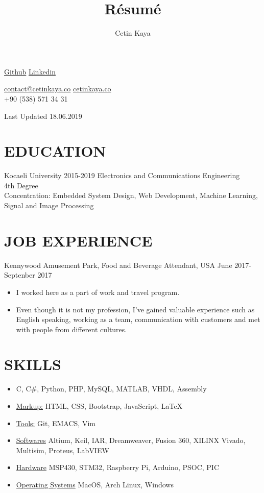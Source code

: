 \documentclass[8pt,twocolumn]{article}
\makeatletter
\renewcommand{\maketitle}{
\begin{center}
{\huge
\thetitle{
}
\vspace{0.5em}

}
{
\huge \bfseries
\theauthor}
\vspace{0.5em}

\faGithub\hspace{0.5em}\textcolor{Mycolor1}{\href{https://github.com/Zrrck?tab=repositories}{Github}}\hspace{0.5em}
\faLinkedin\hspace{0.5em}\textcolor{Mycolor1}{\href{https://www.linkedin.com/in/cetin-kaya/}{Linkedin}}\\\vspace{0.5em}

\faEnvelope \hspace{0.2em}\href{mailto:contact@cetinkaya.co}{contact@cetinkaya.co}\hspace{0.2em}
\faWordpress \hspace{0.2em}\textcolor{Mycolor1}{\href{http://cetinkaya.co}{cetinkaya.co}}\hspace{0.2em}\\
\vspace{0.5em}
\faPhoneSquare+90 (538) 571 34 31\vspace{1.em}



Last Updated 18.06.2019

\end{center}
}
\makeatother
\begin{document}
\title{R\'esum\'e}
\author{Cetin Kaya}
\maketitle




\section{EDUCATION}
Kocaeli University \hspace{10.em} 2015-2019
Electronics and Communications Engineering\\ 4th Degree \\
Concentration: Embedded System Design, Web Development, Machine Learning, Signal and Image Processing

\section{JOB EXPERIENCE}
Kennywood Amusement Park, Food and Beverage Attendant, USA \hspace{6.em}June 2017-Septenber 2017

\begin{itemize}
\itemsep0em
\item I worked here as a part of work and travel program. 
\item Even though it is not my profession, I've gained valuable
experience such as English speaking, working as a team,
communication with customers and met with people from different
cultures.
\end{itemize}


\section{SKILLS}
\begin{itemize}
\item {}
C, C\#, Python, PHP, MySQL, MATLAB, VHDL, Assembly


\item \underline{Markup:}
HTML, CSS, Bootstrap, JavaScript, {\LaTeX}
\item\underline{Tools:}
Git, EMACS, Vim
\item\underline{ Softwares}
Altium, Keil, IAR, Dreamweaver, Fusion 360, XILINX Vivado, Multisim, Proteus, LabVIEW
\item \underline{Hardware}
MSP430, STM32, Raspberry Pi, Arduino, PSOC, PIC

\item  \underline{Operating Systems}
MacOS, Arch Linux, Windows
\end{itemize}
\end{document}
